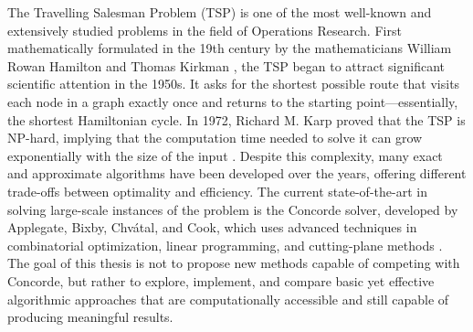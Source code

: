 The Travelling Salesman Problem (TSP) is one of the most well-known and extensively studied problems in the field of Operations Research. 
First mathematically formulated in the 19th century by the mathematicians William Rowan Hamilton and Thomas Kirkman \cite{Biggs1986Graph}, the TSP began to attract significant scientific attention in the 1950s. 
It asks for the shortest possible route that visits each node in a graph exactly once and returns to the starting point—essentially, the shortest Hamiltonian cycle. 
In 1972, Richard M. Karp proved that the TSP is NP-hard, implying that the computation time needed to solve it can grow exponentially with the size of the input \cite{Karp1972}. Despite this complexity, 
many exact and approximate algorithms have been developed over the years, offering different trade-offs between optimality and efficiency. The current state-of-the-art in solving large-scale 
instances of the problem is the Concorde solver, developed by Applegate, Bixby, Chvátal, and Cook, which uses advanced techniques in combinatorial optimization, linear programming, and cutting-plane methods \cite{Applegate2006}. 
The goal of this thesis is not to propose new methods capable of competing with Concorde, but rather to explore, implement, and compare basic yet effective algorithmic approaches that are computationally accessible and still capable of producing meaningful results.